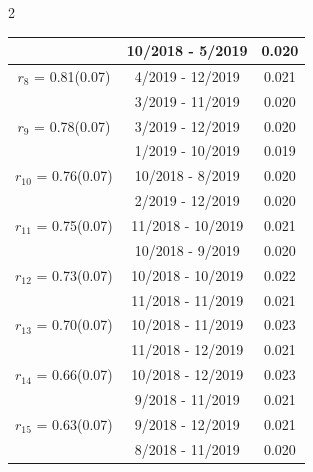 \begin{multicols}{2}
{\begin{tabular}{ccc}
&       10/2018 -  5/2019 &        0.020  \vspace{-.02in} \\ \hline 
  $r_{ 8}$ = 0.81(0.07) &       4/2019 - 12/2019 &        0.021   \vspace{-.10in} \\  
&        3/2019 - 11/2019 &        0.020  \vspace{-.02in} \\ \hline 
  $r_{ 9}$ = 0.78(0.07) &       3/2019 - 12/2019 &        0.020   \vspace{-.10in} \\  
&        1/2019 - 10/2019 &        0.019  \vspace{-.02in} \\ \hline 
  $r_{10}$ = 0.76(0.07) &      10/2018 -  8/2019 &        0.020   \vspace{-.10in} \\  
&        2/2019 - 12/2019 &        0.020  \vspace{-.02in} \\ \hline 
  $r_{11}$ = 0.75(0.07) &      11/2018 - 10/2019 &        0.021   \vspace{-.10in} \\  
&       10/2018 -  9/2019 &        0.020  \vspace{-.02in} \\ \hline 
  $r_{12}$ = 0.73(0.07) &      10/2018 - 10/2019 &        0.022   \vspace{-.10in} \\  
&       11/2018 - 11/2019 &        0.021  \vspace{-.02in} \\ \hline 
  $r_{13}$ = 0.70(0.07) &      10/2018 - 11/2019 &        0.023   \vspace{-.10in} \\  
&       11/2018 - 12/2019 &        0.021  \vspace{-.02in} \\ \hline 
  $r_{14}$ = 0.66(0.07) &      10/2018 - 12/2019 &        0.023   \vspace{-.10in} \\  
&        9/2018 - 11/2019 &        0.021  \vspace{-.02in} \\ \hline 
  $r_{15}$ = 0.63(0.07) &       9/2018 - 12/2019 &        0.021   \vspace{-.10in} \\  
&        8/2018 - 11/2019 &        0.020  \vspace{-.02in} \\ \hline 

\end{tabular}}
\end{multicols}
